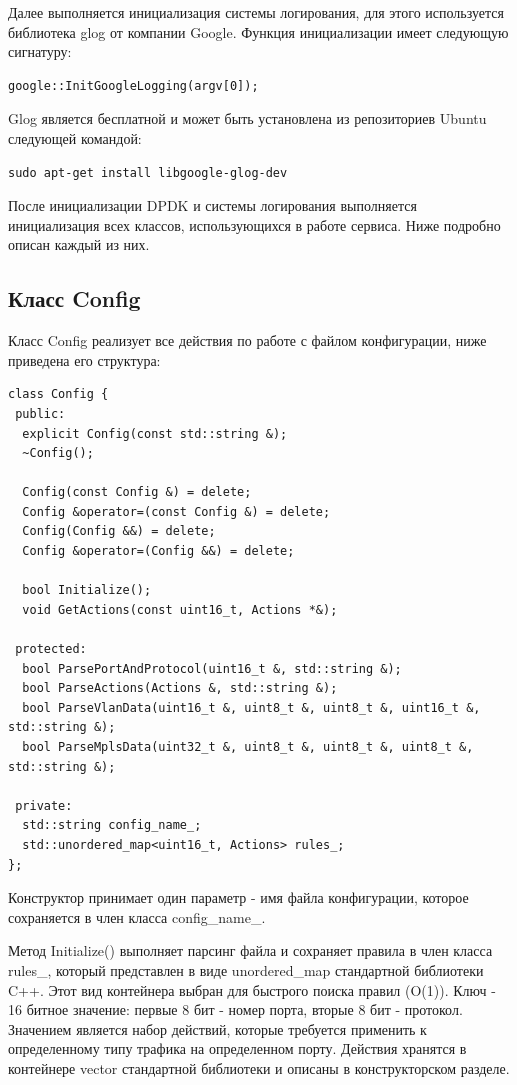 Далее выполняется инициализация системы логирования, для этого используется библиотека glog от компании Google. Функция инициализации имеет следующую сигнатуру:
\begin{lstlisting}
google::InitGoogleLogging(argv[0]);
\end{lstlisting}

Glog является бесплатной и может быть установлена из репозиториев Ubuntu следующей командой:
\begin{lstlisting}
sudo apt-get install libgoogle-glog-dev
\end{lstlisting}

После инициализации DPDK и системы логирования выполняется инициализация всех классов, использующихся в работе сервиса. Ниже подробно описан каждый из них.

\subsection{Класс Config}
Класс Config реализует все действия по работе с файлом конфигурации, ниже приведена его структура:
\begin{lstlisting}
class Config {
 public:
  explicit Config(const std::string &);
  ~Config();

  Config(const Config &) = delete;
  Config &operator=(const Config &) = delete;
  Config(Config &&) = delete;
  Config &operator=(Config &&) = delete;

  bool Initialize();
  void GetActions(const uint16_t, Actions *&);

 protected:
  bool ParsePortAndProtocol(uint16_t &, std::string &);
  bool ParseActions(Actions &, std::string &);
  bool ParseVlanData(uint16_t &, uint8_t &, uint8_t &, uint16_t &, std::string &);
  bool ParseMplsData(uint32_t &, uint8_t &, uint8_t &, uint8_t &, std::string &);

 private:
  std::string config_name_;
  std::unordered_map<uint16_t, Actions> rules_;
};
\end{lstlisting}

Конструктор принимает один параметр - имя файла конфигурации, которое сохраняется в член класса config\_name\_.

Метод Initialize() выполняет парсинг файла и сохраняет правила в член класса rules\_, который представлен в виде unordered\_map стандартной библиотеки C++. Этот вид контейнера выбран для быстрого поиска правил (O(1)). Ключ - 16 битное значение: первые 8 бит - номер порта, вторые 8 бит - протокол. Значением является набор действий, которые требуется применить к определенному типу трафика на определенном порту. Действия хранятся в контейнере vector стандартной библиотеки и описаны в конструкторском разделе.

